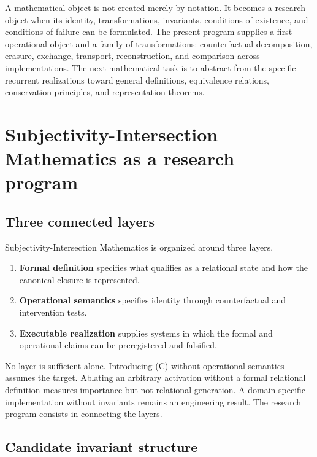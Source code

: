 \documentclass[11pt,a4paper]{article}
\begin{document}
A mathematical object is not created merely by notation. It becomes a research object when its identity, transformations, invariants, conditions of existence, and conditions of failure can be formulated. The present program supplies a first operational object and a family of transformations: counterfactual decomposition, erasure, exchange, transport, reconstruction, and comparison across implementations. The next mathematical task is to abstract from the specific recurrent realizations toward general definitions, equivalence relations, conservation principles, and representation theorems.

\section{Subjectivity-Intersection Mathematics as a research program}

\subsection{Three connected layers}

Subjectivity-Intersection Mathematics is organized around three layers.
\begin{enumerate}
  \item \textbf{Formal definition} specifies what qualifies as a relational state and how the canonical closure is represented.
  \item \textbf{Operational semantics} specifies identity through counterfactual and intervention tests.
  \item \textbf{Executable realization} supplies systems in which the formal and operational claims can be preregistered and falsified.
\end{enumerate}
No layer is sufficient alone. Introducing (C) without operational semantics assumes the target. Ablating an arbitrary activation without a formal relational definition measures importance but not relational generation. A domain-specific implementation without invariants remains an engineering result. The research program consists in connecting the layers.

\subsection{Candidate invariant structure}
\end{document}
